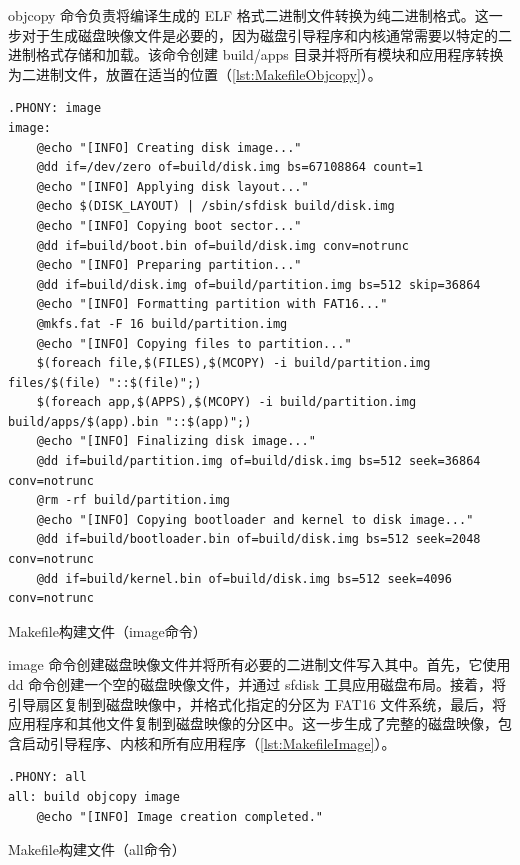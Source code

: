 objcopy 命令负责将编译生成的 ELF 格式二进制文件转换为纯二进制格式。这一步对于生成磁盘映像文件是必要的，因为磁盘引导程序和内核通常需要以特定的二进制格式存储和加载。该命令创建 build/apps 目录并将所有模块和应用程序转换为二进制文件，放置在适当的位置（\cref{lst:MakefileObjcopy}）。

\begin{listing}[htbp]
    \begin{verbatim}
.PHONY: image
image:
    @echo "[INFO] Creating disk image..."
    @dd if=/dev/zero of=build/disk.img bs=67108864 count=1
    @echo "[INFO] Applying disk layout..."
    @echo $(DISK_LAYOUT) | /sbin/sfdisk build/disk.img
    @echo "[INFO] Copying boot sector..."
    @dd if=build/boot.bin of=build/disk.img conv=notrunc
    @echo "[INFO] Preparing partition..."
    @dd if=build/disk.img of=build/partition.img bs=512 skip=36864
    @echo "[INFO] Formatting partition with FAT16..."
    @mkfs.fat -F 16 build/partition.img
    @echo "[INFO] Copying files to partition..."
    $(foreach file,$(FILES),$(MCOPY) -i build/partition.img files/$(file) "::$(file)";)
    $(foreach app,$(APPS),$(MCOPY) -i build/partition.img build/apps/$(app).bin "::$(app)";)
    @echo "[INFO] Finalizing disk image..."
    @dd if=build/partition.img of=build/disk.img bs=512 seek=36864 conv=notrunc
    @rm -rf build/partition.img
    @echo "[INFO] Copying bootloader and kernel to disk image..."
    @dd if=build/bootloader.bin of=build/disk.img bs=512 seek=2048 conv=notrunc
    @dd if=build/kernel.bin of=build/disk.img bs=512 seek=4096 conv=notrunc        
    \end{verbatim}
    \caption{Makefile构建文件（image命令）}\label{lst:MakefileImage}
\end{listing}

image 命令创建磁盘映像文件并将所有必要的二进制文件写入其中。首先，它使用 dd 命令创建一个空的磁盘映像文件，并通过 sfdisk 工具应用磁盘布局。接着，将引导扇区复制到磁盘映像中，并格式化指定的分区为 FAT16 文件系统，最后，将应用程序和其他文件复制到磁盘映像的分区中。这一步生成了完整的磁盘映像，包含启动引导程序、内核和所有应用程序（\cref{lst:MakefileImage}）。

\begin{listing}[htbp]
    \begin{verbatim}
.PHONY: all
all: build objcopy image
    @echo "[INFO] Image creation completed."
    \end{verbatim}
    \caption{Makefile构建文件（all命令）}\label{lst:MakefileAll}
\end{listing}

